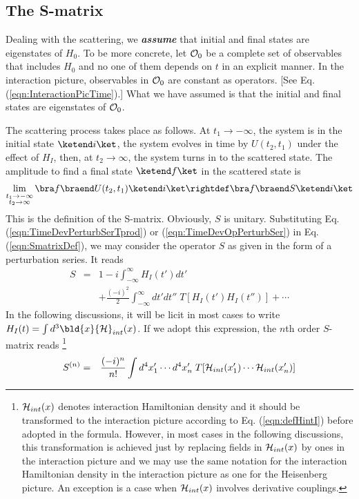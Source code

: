 \subsection{The S-matrix}

Dealing with the scattering, we {\bf \textit{assume}} that initial and final states are
eigenstates of $H_0$. To be more concrete, let ${\cal O}_0$ be a complete set of
observables that includes $H_0$ and no one of them depends on $t$ in an explicit manner.
In the interaction picture, observables in ${\cal O}_0$ are constant as operators. [See Eq.
(\ref{eqn:InteractionPicTime}).] What we have assumed is that the initial and final states
are eigenstates of ${\cal O}_0$.

The scattering process takes place as follows. At $t_1 \to -\infty$, the system is in the initial
state $\ketend i \ket$, the system evolves in time by $U(t_2, t_1)$ under the effect of
$H_I$, then, at $t_2 \to \infty$, the system turns in to the scattered state.
The amplitude to find a final state $\ketend f \ket$ in the scattered state is 
\begin{eqnarray}
\lim_{\stackrel{\scriptstyle t_1 \to -\infty}{t_2 \to \infty}}
\bra f \braend U(t_2, t_1) \ketend i \ket
\rightdef
\bra f \braend S \ketend i \ket
\label{eqn:SmatrixDef}
\end{eqnarray}
This is the definition of the S-matrix. Obviously, $S$ is unitary.
Substituting Eq. (\ref{eqn:TimeDevPerturbSerTprod}) or (\ref{eqn:TimeDevOpPerturbSer}) 
in Eq. (\ref{eqn:SmatrixDef}), we 
may consider the operator $S$ as given in the form of a perturbation series.
It reads
\begin{eqnarray}
 S 
&=&
1 
 -i \int_{-\infty}^\infty H_I (t') dt'
\nonumber\\
&&+
\frac{(-i)^2}{2}
\int_{-\infty}^\infty dt'
 dt''
\;T[ H_I (t') H_I (t'')]
+ \cdots
\label{eqn:SmatrixPertSer}
\end{eqnarray}
In the following discussions, it will be licit in most cases
to write $H_I(t) = \int d^3 \bld{x} {\cal H}_{int}(x)$.
If we adopt this expression, the $n$th order $S$-matrix reads
\footnote{
${\cal H}_{int}(x)$ denotes interaction Hamiltonian density
and it should be transformed to the interaction picture according to 
Eq. (\ref{eqn:defHintI}) before adopted in the formula.
However, in most cases in the following discussions,
this transformation is achieved just by replacing fields in
${\cal H}_{int}(x)$ by ones in the interaction picture
and we may use the same notation for the interaction Hamiltonian
density in the interaction picture as one for the Heisenberg picture.
An exception is a case when ${\cal H}_{int}(x)$ involves
derivative couplings.
}
\begin{eqnarray}
 S^{(n)} 
&=&
\frac{(-i)^n}{n!}
\int d^4x_1' \cdots d^4x_n'
\;T[ 
{\cal H}_{int}(x_1') \cdots {\cal H}_{int}(x_n')
]
\label{eqn:nthorderSmatrix}
\end{eqnarray}


